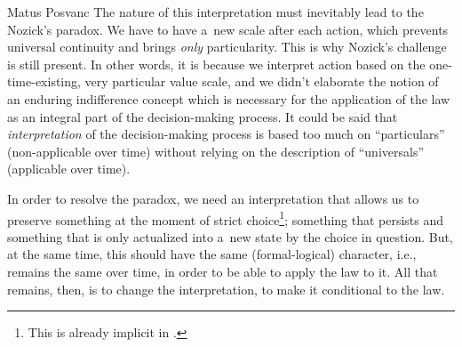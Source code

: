 \begin{artengenv}{Matus Posvanc}
The nature of this interpretation must inevitably lead to the Nozick's paradox. We have to have a~new scale after each action, which prevents universal continuity and brings \textit{only} particularity. This is why Nozick's challenge is still present. In other words, it is because we interpret action based on the one-time-existing, very particular value scale, and we didn't elaborate the notion of an enduring indifference concept which is necessary for the application of the law as an integral part of the decision-making process. It could be said that \textit{interpretation} of the decision-making process is based too much on ``particulars'' (non-applicable over time) without relying on the description of ``universals'' (applicable over time).



In order to resolve the paradox, we need an interpretation that allows us to preserve something at the moment of strict choice\footnote{This is already implicit in 
\parencites[][]{Block1980On}[][]{Block2009Rejoinder}.%
}; something that persists and something that is only actualized into a~new state by the choice in question. But, at the same time, this should have the same (formal-logical) character, i.e., remains the same over time, in order to be able to apply the law to it. All that remains, then, is to change the interpretation, to make it conditional to the law.




\end{artengenv}
